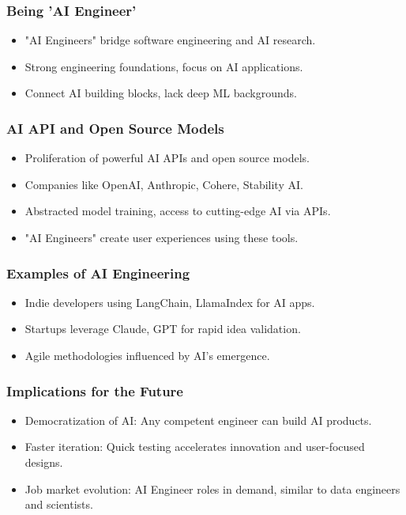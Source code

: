 \begin{frame}[fragile]\frametitle{Being 'AI Engineer'}
\begin{itemize}
    \item "AI Engineers" bridge software engineering and AI research.
    \item Strong engineering foundations, focus on AI applications.
    \item Connect AI building blocks, lack deep ML backgrounds.
\end{itemize}
\end{frame}

\begin{frame}[fragile]\frametitle{AI API and Open Source Models}
\begin{itemize}
    \item Proliferation of powerful AI APIs and open source models.
    \item Companies like OpenAI, Anthropic, Cohere, Stability AI.
    \item Abstracted model training, access to cutting-edge AI via APIs.
    \item "AI Engineers" create user experiences using these tools.
\end{itemize}
\end{frame}

\begin{frame}[fragile]\frametitle{Examples of AI Engineering}
\begin{itemize}
    \item Indie developers using LangChain, LlamaIndex for AI apps.
    \item Startups leverage Claude, GPT for rapid idea validation.
    \item Agile methodologies influenced by AI's emergence.
\end{itemize}
\end{frame}

\begin{frame}[fragile]\frametitle{Implications for the Future}
\begin{itemize}
    \item Democratization of AI: Any competent engineer can build AI products.
    \item Faster iteration: Quick testing accelerates innovation and user-focused designs.
    \item Job market evolution: AI Engineer roles in demand, similar to data engineers and scientists.
\end{itemize}
\end{frame}

